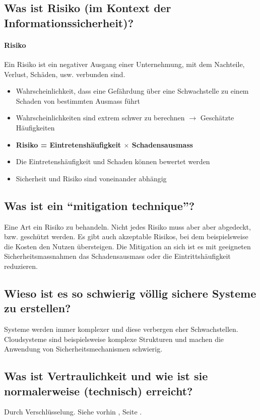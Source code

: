 \subsection*{Was ist Risiko (im Kontext der Informationssicherheit)?}
\paragraph*{Risiko}\label{para:Risiko}Ein Risiko ist ein negativer Ausgang einer Unternehmung, mit dem Nachteile, Verlust, Schäden, usw. verbunden sind.
\begin{itemize}
    \item Wahrscheinlichkeit, dass eine Gefährdung über eine Schwachstelle zu einem Schaden von bestimmten Ausmass führt
    \item Wahrscheinlichkeiten sind extrem schwer zu berechnen $\rightarrow$ Geschätzte Häufigkeiten
    \item \textbf{Risiko = Eintretenshäufigkeit $\times$ Schadensausmass}
    \item Die Eintretenshäufigkeit und Schaden können bewertet werden
    \item Sicherheit und Risiko sind voneinander abhängig
\end{itemize}

\subsection*{Was ist ein "`mitigation technique"'?}
Eine Art ein Risiko zu behandeln. Nicht jedes Risiko muss aber aber abgedeckt, bzw. geschützt werden. Es gibt auch akzeptable Risikos, bei dem beispielsweise die Kosten den Nutzen übersteigen. Die Mitigation an sich ist es mit geeigneten Sicherheitsmassnahmen das Schadensausmass oder die Eintrittshäufigkeit reduzieren.

\subsection*{Wieso ist es so schwierig völlig sichere Systeme zu erstellen?}
Systeme werden immer komplexer und diese verbergen eher Schwachstellen. Cloudsysteme sind beispielsweise komplexe Strukturen und machen die Anwendung von Sicherheitsmechanismen schwierig.

\subsection*{Was ist Vertraulichkeit und wie ist sie normalerweise (technisch) erreicht?}
Durch Verschlüsselung. Siehe vorhin \underline{}, Seite \pageref{par:Confidentiality}.

